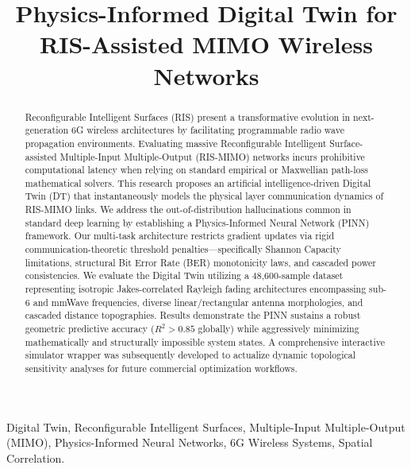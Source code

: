 \documentclass[conference]{IEEEtran}
\begin{document}
\title{Physics-Informed Digital Twin for RIS-Assisted MIMO Wireless Networks}

\author{
}

\maketitle

\begin{abstract}
Reconfigurable Intelligent Surfaces (RIS) present a transformative evolution in next-generation 6G wireless architectures by facilitating programmable radio wave propagation environments. Evaluating massive Reconfigurable Intelligent Surface-assisted Multiple-Input Multiple-Output (RIS-MIMO) networks incurs prohibitive computational latency when relying on standard empirical or Maxwellian path-loss mathematical solvers. This research proposes an artificial intelligence-driven Digital Twin (DT) that instantaneously models the physical layer communication dynamics of RIS-MIMO links. We address the out-of-distribution hallucinations common in standard deep learning by establishing a Physics-Informed Neural Network (PINN) framework. Our multi-task architecture restricts gradient updates via rigid communication-theoretic threshold penalties—specifically Shannon Capacity limitations, structural Bit Error Rate (BER) monotonicity laws, and cascaded power consistencies. We evaluate the Digital Twin utilizing a 48,600-sample dataset representing isotropic Jakes-correlated Rayleigh fading architectures encompassing sub-6 and mmWave frequencies, diverse linear/rectangular antenna morphologies, and cascaded distance topographies. Results demonstrate the PINN sustains a robust geometric predictive accuracy ($R^2 > 0.85$ globally) while aggressively minimizing mathematically and structurally impossible system states. A comprehensive interactive simulator wrapper was subsequently developed to actualize dynamic topological sensitivity analyses for future commercial optimization workflows.
\end{abstract}

\begin{IEEEkeywords}
Digital Twin, Reconfigurable Intelligent Surfaces, Multiple-Input Multiple-Output (MIMO), Physics-Informed Neural Networks, 6G Wireless Systems, Spatial Correlation.
\end{IEEEkeywords}
\end{document}

